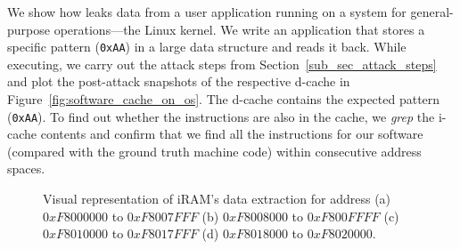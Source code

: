 We show how \sys{} leaks data from a user application running on a system for general-purpose operations---the Linux kernel.
We write an application that stores a specific pattern (\texttt{0xAA}) in a large data structure and reads it back. 
While executing, we carry out the attack steps from Section~\ref{sub_sec_attack_steps} and plot the post-attack snapshots of the respective d-cache in Figure~\ref{fig:software_cache_on_os}. 
The d-cache contains the expected pattern (\ie \texttt{0xAA}). 
To find out whether the instructions are also in the cache, we \textit{grep} the i-cache contents and confirm that we find all the instructions for our software (compared with the ground truth machine code) within consecutive address spaces.




\begin{figure*}
    \centering
    \hfill
    \hfill
    \hfill
    \hfill
    \caption{Visual representation of iRAM's data extraction for address (a) $0xF8000000$ to $0xF8007FFF$ (b) $0xF8008000$ to $0xF800FFFF$ (c) $0xF8010000$ to $0xF8017FFF$ (d) $0xF8018000$ to $0xF8020000$.}
    \label{fig:iRAM}

\end{figure*}

